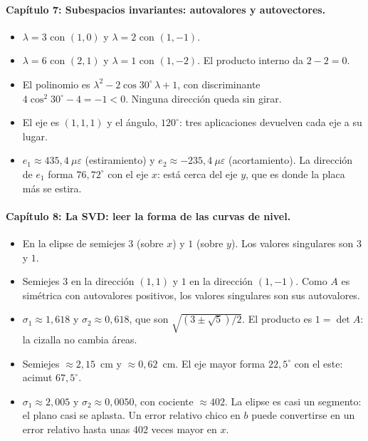 \paragraph{Capítulo 7: Subespacios invariantes: autovalores y autovectores.}
\begin{itemize}
  \item[\ref{pb:07-1}] \(\lambda=3\) con \((1,0)\) y \(\lambda=2\) con \((1,-1)\).
  \item[\ref{pb:07-2}] \(\lambda=6\) con \((2,1)\) y \(\lambda=1\) con \((1,-2)\). El producto interno da \(2-2=0\).
  \item[\ref{pb:07-3}] El polinomio es \(\lambda^2-2\cos30^\circ\,\lambda+1\), con discriminante \(4\cos^2 30^\circ-4=-1<0\). Ninguna dirección queda sin girar.
  \item[\ref{pb:07-4}] El eje es \((1,1,1)\) y el ángulo, \(120^\circ\): tres aplicaciones devuelven cada eje a su lugar.
  \item[\ref{pb:07-5}] \(e_1\approx435{,}4\ \mu\varepsilon\) (estiramiento) y \(e_2\approx-235{,}4\ \mu\varepsilon\) (acortamiento). La dirección de \(e_1\) forma \(76{,}72^\circ\) con el eje \(x\): está cerca del eje \(y\), que es donde la placa más se estira.
\end{itemize}

\paragraph{Capítulo 8: La SVD: leer la forma de las curvas de nivel.}
\begin{itemize}
  \item[\ref{pb:08-1}] En la elipse de semiejes \(3\) (sobre \(x\)) y \(1\) (sobre \(y\)). Los valores singulares son \(3\) y \(1\).
  \item[\ref{pb:08-2}] Semiejes \(3\) en la dirección \((1,1)\) y \(1\) en la dirección \((1,-1)\). Como \(A\) es simétrica con autovalores positivos, los valores singulares son sus autovalores.
  \item[\ref{pb:08-3}] \(\sigma_1\approx1{,}618\) y \(\sigma_2\approx0{,}618\), que son \(\sqrt{(3\pm\sqrt5)/2}\). El producto es \(1=\det A\): la cizalla no cambia áreas.
  \item[\ref{pb:08-4}] Semiejes \(\approx2{,}15\)~cm y \(\approx0{,}62\)~cm. El eje mayor forma \(22{,}5^\circ\) con el este: acimut \(67{,}5^\circ\).
  \item[\ref{pb:08-5}] \(\sigma_1\approx2{,}005\) y \(\sigma_2\approx0{,}0050\), con cociente \(\approx402\). La elipse es casi un segmento: el plano casi se aplasta. Un error relativo chico en \(b\) puede convertirse en un error relativo hasta unas 402 veces mayor en \(x\).
\end{itemize}

